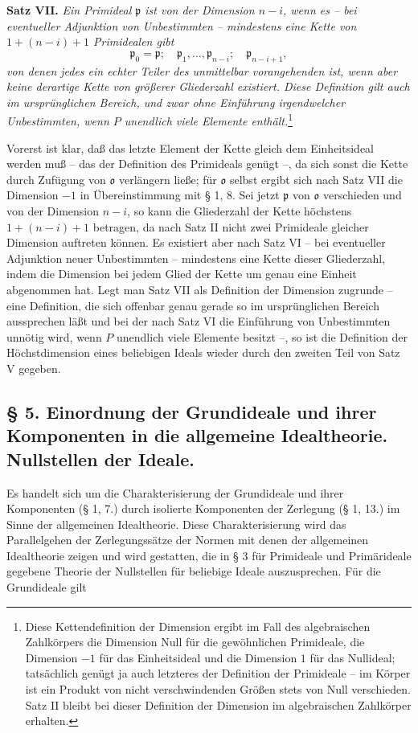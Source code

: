 \documentclass[11pt]{article}
\providecommand{\frakp}{\mathfrak p}
\providecommand{\frako}{\mathfrak o}
\begin{document}
\textbf{Satz VII.} \emph{Ein Primideal $\frakp$ ist von der Dimension $n-i$, wenn es -- bei eventueller Adjunktion von Unbestimmten -- mindestens eine Kette von $1+(n-i)+1$ Primidealen gibt}
\[
 \frakp_0=\frakp;\quad \frakp_1,\ldots,\frakp_{n-i};\quad \frakp_{n-i+1},
\]
\emph{von denen jedes ein echter Teiler des unmittelbar vorangehenden ist, wenn aber keine derartige Kette von größerer Gliederzahl existiert. Diese Definition gilt auch im ursprünglichen Bereich, und zwar ohne Einführung irgendwelcher Unbestimmten, wenn $P$ unendlich viele Elemente enthält.}\footnote{Diese Kettendefinition der Dimension ergibt im Fall des algebraischen Zahlkörpers die Dimension Null für die gewöhnlichen Primideale, die Dimension $-1$ für das Einheitsideal und die Dimension $1$ für das Nullideal; tatsächlich genügt ja auch letzteres der Definition der Primideale -- im Körper ist ein Produkt von nicht verschwindenden Größen stets von Null verschieden. Satz II bleibt bei dieser Definition der Dimension im algebraischen Zahlkörper erhalten.}

Vorerst ist klar, daß das letzte Element der Kette gleich dem Einheitsideal werden muß -- das der Definition des Primideals genügt --, da sich sonst die Kette durch Zufügung von $\frako$ verlängern ließe; für $\frako$ selbst ergibt sich nach Satz VII die Dimension $-1$ in Übereinstimmung mit § 1, 8. Sei jetzt $\frakp$ von $\frako$ verschieden und von der Dimension $n-i$, so kann die Gliederzahl der Kette höchstens $1+(n-i)+1$ betragen, da nach Satz II nicht zwei Primideale gleicher Dimension auftreten können. Es existiert aber nach Satz VI -- bei eventueller Adjunktion neuer Unbestimmten -- mindestens eine Kette dieser Gliederzahl, indem die Dimension bei jedem Glied der Kette um genau eine Einheit abgenommen hat. Legt man Satz VII als Definition der Dimension zugrunde -- eine Definition, die sich offenbar genau gerade so im ursprünglichen Bereich aussprechen läßt und bei der nach Satz VI die Einführung von Unbestimmten unnötig wird, wenn $P$ unendlich viele Elemente besitzt --, so ist die Definition der Höchstdimension eines beliebigen Ideals wieder durch den zweiten Teil von Satz V gegeben.

\subsection*{§ 5. Einordnung der Grundideale und ihrer Komponenten in die allgemeine Idealtheorie. Nullstellen der Ideale.}

Es handelt sich um die Charakterisierung der Grundideale und ihrer Komponenten (§ 1, 7.) durch isolierte Komponenten der Zerlegung (§ 1, 13.) im Sinne der allgemeinen Idealtheorie. Diese Charakterisierung wird das Parallelgehen der Zerlegungssätze der Normen mit denen der allgemeinen Idealtheorie zeigen und wird gestatten, die in § 3 für Primideale und Primärideale gegebene Theorie der Nullstellen für beliebige Ideale auszusprechen. Für die Grundideale gilt
\end{document}
